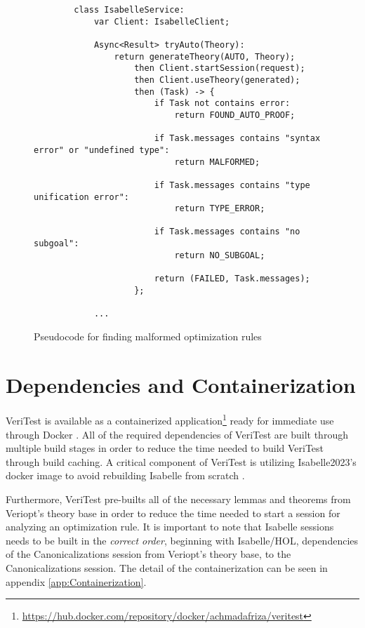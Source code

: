 \begin{figure}[!htb]
    \begin{lstlisting}
        class IsabelleService:
            var Client: IsabelleClient;
            
            Async<Result> tryAuto(Theory):
                return generateTheory(AUTO, Theory);
                    then Client.startSession(request);
                    then Client.useTheory(generated);
                    then (Task) -> {
                        if Task not contains error:
                            return FOUND_AUTO_PROOF;

                        if Task.messages contains "syntax error" or "undefined type":
                            return MALFORMED;
                        
                        if Task.messages contains "type unification error":
                            return TYPE_ERROR;

                        if Task.messages contains "no subgoal":
                            return NO_SUBGOAL;
                        
                        return (FAILED, Task.messages);
                    };
            
            ...
    \end{lstlisting}

    \caption{Pseudocode for finding malformed optimization rules}
    \label{fig:malformedPseudocode}
\end{figure}

\section{Dependencies and Containerization}
\label{sec:Containerization}

VeriTest is available as a containerized application\footnote{\href{https://hub.docker.com/repository/docker/achmadafriza/veritest}{https://hub.docker.com/repository/docker/achmadafriza/veritest}} 
ready for immediate use through Docker \cite{docker_inc_docker_2022}. All of the required dependencies of VeriTest are built through multiple build 
stages in order to reduce the time needed to build VeriTest through build caching. A critical component of VeriTest is utilizing Isabelle2023's docker 
image to avoid rebuilding Isabelle from scratch \cite[Sec. 7.1]{isabelleSystem}.

Furthermore, VeriTest pre-builts all of the necessary lemmas and 
theorems from Veriopt's theory base in order to reduce the time needed to start a session for analyzing an optimization rule. It is important to note 
that Isabelle sessions needs to be built in the \emph{correct order}, beginning with Isabelle/HOL, dependencies of the Canonicalizations session from 
Veriopt's theory base, to the Canonicalizations session. The detail of the containerization can be seen in appendix \ref{app:Containerization}.

